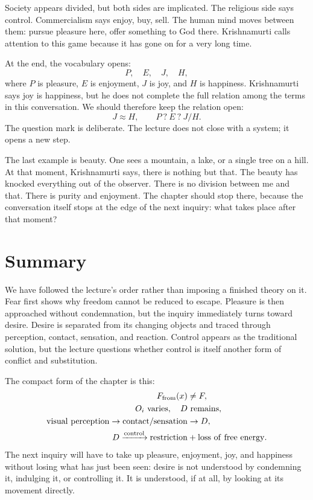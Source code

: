 Society appears divided, but both sides are implicated. The religious side says control. Commercialism says enjoy, buy, sell. The human mind moves between them: pursue pleasure here, offer something to God there. Krishnamurti calls attention to this game because it has gone on for a very long time.

At the end, the vocabulary opens:
\begin{equation}
P,\quad E,\quad J,\quad H,
\end{equation}
where \(P\) is pleasure, \(E\) is enjoyment, \(J\) is joy, and \(H\) is happiness. Krishnamurti says joy is happiness, but he does not complete the full relation among the terms in this conversation. We should therefore keep the relation open:
\begin{equation}
J \approx H,
\qquad
P \ ? \ E \ ? \ J/H.
\end{equation}
The question mark is deliberate. The lecture does not close with a system; it opens a new step.

The last example is beauty. One sees a mountain, a lake, or a single tree on a hill. At that moment, Krishnamurti says, there is nothing but that. The beauty has knocked everything out of the observer. There is no division between me and that. There is purity and enjoyment. The chapter should stop there, because the conversation itself stops at the edge of the next inquiry: what takes place after that moment?

\section{Summary}

We have followed the lecture's order rather than imposing a finished theory on it. Fear first shows why freedom cannot be reduced to escape. Pleasure is then approached without condemnation, but the inquiry immediately turns toward desire. Desire is separated from its changing objects and traced through perception, contact, sensation, and reaction. Control appears as the traditional solution, but the lecture questions whether control is itself another form of conflict and substitution.

The compact form of the chapter is this:
\begin{align}
F_{\mathrm{from}}(x) &\neq F,\\
O_i \ \hbox{varies},\quad D &\ \hbox{remains},\\
\mathrm{visual\ perception} \to \mathrm{contact/sensation} &\to D,\\
D \xrightarrow{\mathrm{control}} \mathrm{restriction} &+ \mathrm{loss\ of\ free\ energy}.
\end{align}
The next inquiry will have to take up pleasure, enjoyment, joy, and happiness without losing what has just been seen: desire is not understood by condemning it, indulging it, or controlling it. It is understood, if at all, by looking at its movement directly.
